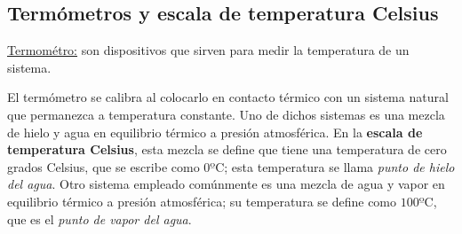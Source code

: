 \subsection{Termómetros y escala de temperatura Celsius}

  \PN \underline{Termométro:} son dispositivos que sirven para medir la temperatura de un sistema.

  \vspace{3mm}
  \PN El termómetro se calibra al colocarlo en contacto térmico con un sistema natural que permanezca a temperatura
  constante. Uno de dichos sistemas es una mezcla de hielo y agua en equilibrio térmico a presión atmosférica. En la
  \textbf{escala de temperatura Celsius}, esta mezcla se define que tiene una temperatura de cero grados Celsius, que se
  escribe como $0º$C; esta temperatura se llama \textit{punto de hielo del agua}. Otro sistema empleado comúnmente es
  una mezcla de agua y vapor en equilibrio térmico a presión atmosférica; su temperatura se define como $100º$C, que es
  el \textit{punto de vapor del agua}.
